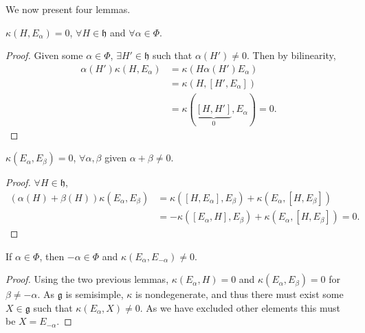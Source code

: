 We now present four lemmas.

\begin{lemma}
    $\kappa \left( H, E_\alpha \right) = 0$, $\forall H \in \mathfrak{h}$ and $\forall \alpha \in \Phi$.
\end{lemma}
\begin{proof}
    Given some $\alpha \in \Phi$, $\exists  H' \in \mathfrak{h}$ such that $\alpha \left( H' \right) \neq 0$. Then by bilinearity,
    \begin{align}
        \alpha \left( H' \right) \kappa \left( H, E_\alpha \right) &= \kappa \left( H \alpha \left( H' \right) E_\alpha \right)  \\
        &= \kappa \left( H, \left[ H', E_\alpha \right]  \right)  \\
        &= \kappa \left( \underbrace{\left[ H, H' \right]}_{0} , E_\alpha \right) 
        = 0 
    .\end{align}
\end{proof}

\begin{lemma}
    $\kappa \left( E_\alpha, E_\beta \right) = 0$, $\forall \alpha , \beta$ given $\alpha + \beta \neq 0 $.
\end{lemma}

\begin{proof}
    $\forall H \in \mathfrak{h}$,
    \begin{align}
        \left( \alpha \left( H \right) + \beta \left( H \right)  \right) \kappa \left( E_\alpha, E_\beta \right) &= \kappa \left( \left[ H, E_\alpha \right] , E_{\beta} \right) + \kappa \left( E_\alpha, \left[ H, E_\beta \right]  \right)   \\
        &= -\kappa \left( \left[ E_\alpha, H \right] , E_{\beta} \right) + \kappa \left( E_\alpha, \left[ H, E_\beta \right]  \right) = 0
    .\end{align}
\end{proof}

\begin{lemma}
    If $\alpha \in \Phi$, then $-\alpha \in \Phi$ and $\kappa \left( E_\alpha, E_{-\alpha} \right) \neq 0$.
\end{lemma}

\begin{proof}
    Using the two previous lemmas, $\kappa \left( E_\alpha, H \right) = 0$ and $\kappa \left( E_\alpha, E_\beta \right) = 0$ for $\beta \neq -\alpha$. As $\mathfrak{g}$ is semisimple, $\kappa$ is nondegenerate, and thus there must exist some $X \in \mathfrak{g}$ such that $\kappa \left( E_\alpha, X \right) \neq 0$. As we have excluded other elements this must be $X = E_{-\alpha}$.
\end{proof}

